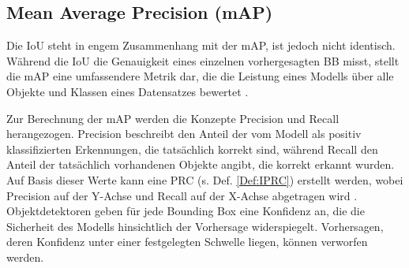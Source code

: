 





\subsection{Mean Average Precision (mAP)}


Die \acrlong{IoU} steht in engem Zusammenhang mit der \acrfull{mAP}, ist jedoch nicht identisch. Während die \acrshort{IoU} die Genauigkeit eines einzelnen vorhergesagten \acrshort{BB} misst, stellt die \acrshort{mAP} eine umfassendere Metrik dar, die die Leistung eines Modells über alle Objekte und Klassen eines Datensatzes bewertet \cite{ultralyics_iou}.

Zur Berechnung der \acrshort{mAP} werden die Konzepte Precision und Recall herangezogen. Precision beschreibt den Anteil der vom Modell als positiv klassifizierten Erkennungen, die tatsächlich korrekt sind, während Recall den Anteil der tatsächlich vorhandenen Objekte angibt, die korrekt erkannt wurden. Auf Basis dieser Werte kann eine \acrfull{PRC} (s. Def. \ref{Def:IPRC}) erstellt werden, wobei Precision auf der Y-Achse und Recall auf der X-Achse abgetragen wird \cite{Goodfellow-et-al-2016}. Objektdetektoren geben für jede Bounding Box eine Konfidenz an, die die Sicherheit des Modells hinsichtlich der Vorhersage widerspiegelt. Vorhersagen, deren Konfidenz unter einer festgelegten Schwelle liegen, können verworfen werden. 

